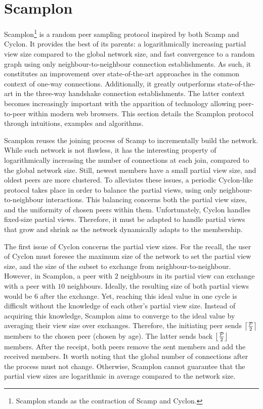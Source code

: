 
\section{Scamplon}
\label{sec:proposal}

Scamplon\footnote{Scamplon stands as the contraction of Scamp and Cyclon.} is a
random peer sampling protocol inspired by both Scamp and Cyclon. It provides
the best of its parents: a logarithmically increasing partial view size
compared to the global network size, and fast convergence to a random graph
using only neighbour-to-neighbour connection establishments. As such, it
constitutes an improvement over state-of-the-art approaches in the common
context of one-way connections. Additionally, it greatly outperforms
state-of-the-art in the three-way handshake connection establishments. The
latter context becomes increasingly important with the apparition of technology
allowing peer-to-peer within modern web browsers. This section details the
Scamplon protocol through intuitions, examples and algorithms.

\begin{asparadesc}
\item [Scamplon] reuses the joining process of Scamp to incrementally build the
network. While such network is not flawless, it has the interesting property of
logarithmically increasing the number of connections at each join, compared to
the global network size. Still, newest members have a small partial view size,
and oldest peers are more clustered. To alleviates these issues, a periodic
Cyclon-like protocol takes place in order to balance the partial views, using
only neighbour-to-neighbour interactions. This balancing concerns both the
partial view sizes, and the uniformity of chosen peers within
them. Unfortunately, Cyclon handles fixed-size partial views. Therefore, it
must be adapted to handle partial views that grow and shrink as the network
dynamically adapts to the membership.
\end{asparadesc}

The first issue of Cyclon concerns the partial view sizes. For the recall, the
user of Cyclon must foresee the maximum size of the network to set the partial
view size, and the size of the subset to exchange from neighbour-to-neighbour.
However, in Scamplon, a peer with $2$ neighbours in its partial view can
exchange with a peer with $10$ neighbours. Ideally, the resulting size of both
partial views would be $6$ after the exchange. Yet, reaching this ideal value
in one cycle is difficult without the knowledge of each other's partial view
size. Instead of acquiring this knowledge, Scamplon aims to converge to the
ideal value by averaging their view size over exchanges. Therefore, the
initiating peer sends $\left\lceil\mathcal{P}\over{2}\right\rceil$ members to
the chosen peer (chosen by age). The latter sends back
$\left\lfloor\mathcal{P}\over{2}\right\rfloor$ members. After the receipt, both
peers remove the sent members and add the received members. It worth noting
that the global number of connections after the process must not
change. Otherwise, Scamplon cannot guarantee that the partial view sizes are
logarithmic in average compared to the network size.

